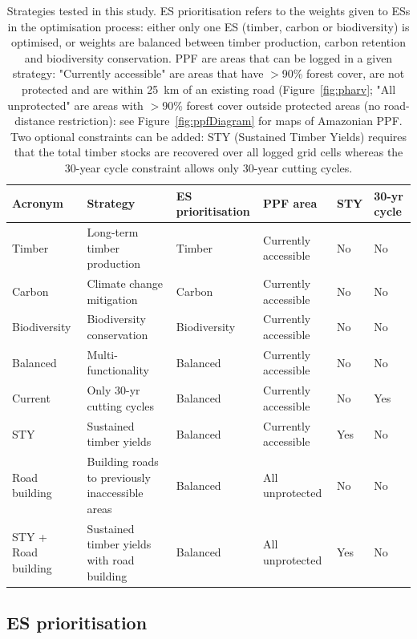 \documentclass{article}
\begin{document}
\begin{table}
    \centering
    \begin{tabularx}{\textwidth}{p{2cm} p{4.5cm} p{2cm} p{3.5cm} p{0.8cm} p{1cm}}
    \toprule
         Acronym & Strategy & ES prioritisation & PPF area &  STY & 30-yr cycle \\
         \midrule
         Timber & Long-term timber production & Timber  & Currently accessible & No & No\\
         Carbon & Climate change mitigation &  Carbon & Currently accessible & No & No\\
         Biodiversity & Biodiversity conservation &  Biodiversity & Currently accessible & No & No \\
         Balanced & Multi-functionality & Balanced & Currently accessible & No & No \\
         Current & Only 30-yr cutting cycles & Balanced & Currently accessible & No & Yes \\
         STY & Sustained timber yields & Balanced & Currently accessible & Yes & No \\
         Road building & Building roads to previously inaccessible areas & Balanced & All unprotected & No & No \\
         STY + Road building & Sustained timber yields with road building & Balanced & All unprotected & Yes & No \\
         \bottomrule
    \end{tabularx}
    \caption{Strategies tested in this study. ES prioritisation refers to the weights given to ESs in the optimisation process: either only one ES (timber, carbon or biodiversity) is optimised, or weights are balanced between timber production, carbon retention and biodiversity conservation. PPF are areas that can be logged in a given strategy: "Currently accessible" are areas that have $>$90\% forest cover, are not protected and are within 25~km of an existing road (Figure~\ref{fig:pharv}; "All unprotected" are areas with $>$90\% forest cover outside protected areas (no road-distance restriction): see Figure~\ref{fig:ppfDiagram} for maps of Amazonian PPF. Two optional constraints can be added: STY (Sustained Timber Yields) requires that the total timber stocks are recovered over all logged grid cells whereas the 30-year cycle constraint allows only 30-year cutting cycles.}
    \label{tab:strategies}
\end{table}

\subsection{ES prioritisation}
\end{document}
